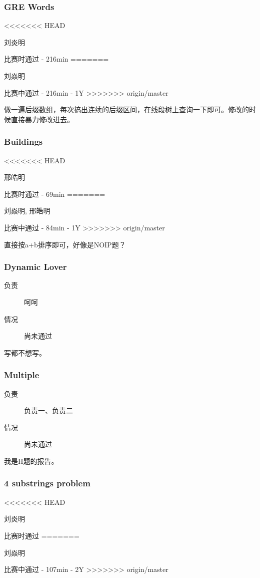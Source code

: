\documentclass[a4paper, 11pt, nofonts, nocap, fancyhdr]{ctexart}
\newcommand{\problem}[1]{\subsubsection{#1}}
\begin{document}
\problem{GRE Words}

\begin{description}
<<<<<<< HEAD
\item[负责] 刘炎明
\item[情况] 比赛时通过 - 216min
=======
\item[负责] 刘焱明
\item[情况] 比赛中通过 - 216min - 1Y
>>>>>>> origin/master
\end{description}

做一遍后缀数组，每次搞出连续的后缀区间，在线段树上查询一下即可。修改的时候直接暴力修改进去。

\problem{Buildings}

\begin{description}
<<<<<<< HEAD
\item[负责] 邢皓明
\item[情况] 比赛时通过 - 69min
=======
\item[负责] 刘焱明, 邢皓明
\item[情况] 比赛中通过 - 84min - 1Y
>>>>>>> origin/master
\end{description}

直接按a+b排序即可，好像是NOIP题？

\problem{Dynamic Lover}

\begin{description}
\item[负责] 呵呵
\item[情况] 尚未通过
\end{description}

写都不想写。


\problem{Multiple}

\begin{description}
\item[负责] 负责一、负责二
\item[情况] 尚未通过
\end{description}

我是H题的报告。

\problem{4 substrings problem}

\begin{description}
<<<<<<< HEAD
\item[负责] 刘炎明
\item[情况] 比赛时通过
=======
\item[负责] 刘焱明
\item[情况] 比赛中通过 - 107min - 2Y
>>>>>>> origin/master
\end{description}
\end{document}
